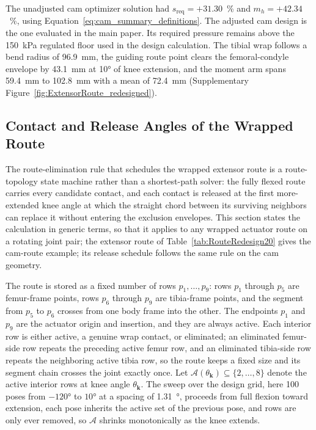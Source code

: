 \documentclass[utf8]{frontiers_suppmat} %
\begin{document}
The unadjusted cam optimizer solution had $s_{\mathrm{req}}=+31.30$~\% and $m_h=+42.34$~\%, using Equation~\eqref{eq:cam_summary_definitions}. The adjusted cam design is the one evaluated in the main paper. Its required pressure remains above the \qty{150}{\kPa} regulated floor used in the design calculation. The tibial wrap follows a bend radius of \qty{96.9}{\mm}, the guiding route point clears the femoral-condyle envelope by \qty{43.1}{\mm} at \ang{10} of knee extension, and the moment arm spans \qty{59.4}{\mm} to \qty{102.8}{\mm} with a mean of \qty{72.4}{\mm} (Supplementary Figure~\ref{fig:ExtensorRoute_redesigned}).

\subsection{Contact and Release Angles of the Wrapped Route}\label{app:contact_release}

The route-elimination rule that schedules the wrapped extensor route is a route-topology state machine rather than a shortest-path solver: the fully flexed route carries every candidate contact, and each contact is released at the first more-extended knee angle at which the straight chord between its surviving neighbors can replace it without entering the exclusion envelopes. This section states the calculation in generic terms, so that it applies to any wrapped actuator route on a rotating joint pair; the extensor route of Table~\ref{tab:RouteRedesign20} gives the cam-route example; its release schedule follows the same rule on the cam geometry.

The route is stored as a fixed number of rows $p_{1},\ldots,p_{9}$: rows $p_{1}$ through $p_{5}$ are femur-frame points, rows $p_{6}$ through $p_{9}$ are tibia-frame points, and the segment from $p_{5}$ to $p_{6}$ crosses from one body frame into the other. The endpoints $p_{1}$ and $p_{9}$ are the actuator origin and insertion, and they are always active. Each interior row is either active, a genuine wrap contact, or eliminated; an eliminated femur-side row repeats the preceding active femur row, and an eliminated tibia-side row repeats the neighboring active tibia row, so the route keeps a fixed size and its segment chain crosses the joint exactly once. Let $\mathcal{A}(\theta_{\mathbf{k}}) \subseteq \{2,\ldots,8\}$ denote the active interior rows at knee angle $\theta_{\mathbf{k}}$. The sweep over the design grid, here 100 poses from $\ang{-120}$ to $\ang{+10}$ at a spacing of \qty{1.31}{\degree}, proceeds from full flexion toward extension, each pose inherits the active set of the previous pose, and rows are only ever removed, so $\mathcal{A}$ shrinks monotonically as the knee extends.
\end{document}
